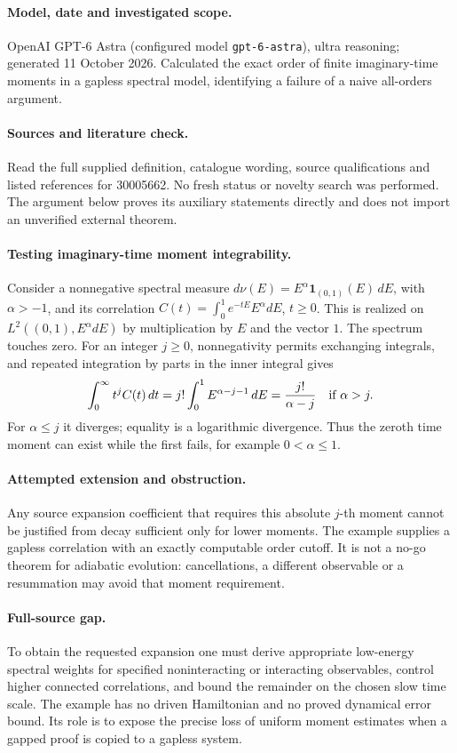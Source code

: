 \documentclass[11pt]{article}
\begin{document}
\paragraph{Model, date and investigated scope.}
OpenAI GPT-6 Astra (configured model \texttt{gpt-6-astra}), ultra reasoning; generated 11 October 2026. Calculated the exact order of finite imaginary-time moments in a gapless spectral model, identifying a failure of a naive all-orders argument.

\paragraph{Sources and literature check.}
Read the full supplied definition, catalogue wording, source qualifications and listed references for 30005662. No fresh status or novelty search was performed. The argument below proves its auxiliary statements directly and does not import an unverified external theorem.

\paragraph{Testing imaginary-time moment integrability.} Consider a nonnegative spectral measure \(d\nu(E)=E^\alpha\mathbf1_{(0,1)}(E)\,dE\), with \(\alpha>-1\), and its correlation \(C(t)=\int_0^1 e^{-tE}E^\alpha dE\), \(t\geq0\). This is realized on \(L^2((0,1),E^\alpha dE)\) by multiplication by \(E\) and the vector \(1\). The spectrum touches zero. For an integer \(j\geq0\), nonnegativity permits exchanging integrals, and repeated integration by parts in the inner integral gives
\[
 \int_0^\infty t^j C(t)\,dt
 =j!\int_0^1 E^{\alpha-j-1}\,dE
 =\frac{j!}{\alpha-j}\quad\hbox{if }\alpha>j.
\]
For \(\alpha\leq j\) it diverges; equality is a logarithmic divergence. Thus the zeroth time moment can exist while the first fails, for example \(0<\alpha\leq1\).
\paragraph{Attempted extension and obstruction.} Any source expansion coefficient that requires this absolute \(j\)-th moment cannot be justified from decay sufficient only for lower moments. The example supplies a gapless correlation with an exactly computable order cutoff. It is not a no-go theorem for adiabatic evolution: cancellations, a different observable or a resummation may avoid that moment requirement.
\paragraph{Full-source gap.} To obtain the requested expansion one must derive appropriate low-energy spectral weights for specified noninteracting or interacting observables, control higher connected correlations, and bound the remainder on the chosen slow time scale. The example has no driven Hamiltonian and no proved dynamical error bound. Its role is to expose the precise loss of uniform moment estimates when a gapped proof is copied to a gapless system.
\end{document}
